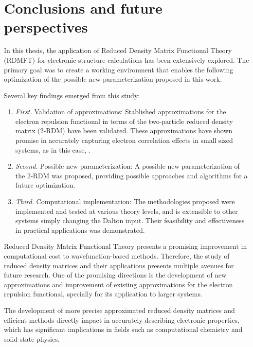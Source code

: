\section{Conclusions and future perspectives} %
\label{sec:conclusions}
In this thesis, the application of Reduced Density Matrix Functional Theory 
(RDMFT) for electronic structure calculations has been extensively explored.
The primary goal was to create a working environment that enables the 
following optimization of the possible new parameterization proposed in this
work.

Several key findings emerged from this study:
\begin{enumerate}[label={}]
    \item \textit{First.} Validation of approximations:
        Stablished approximations for the electron repulsion functional in terms of 
        the two-particle reduced density matrix (2-RDM) have been validated.
        These approximations have shown promise in accurately capturing 
        electron correlation effects in small sized systems, as in this case,
        .
    \item \textit{Second.} Possible new parameterization:
        A possible new parameterization of the 2-RDM was proposed, providing 
        possible approaches and algorithms for a future optimization.
    \item \textit{Third.} Computational implementation:
        The methodologies proposed were implemented and tested at
        various theory levels, and is extensible to other systems
        simply changing the Dalton input.
        Their feasibility and effectiveness in practical applications was
        demonstrated.
\end{enumerate}

Reduced Density Matrix Functional Theory presents a promising improvement
in computational cost to wavefunction-based methods.
Therefore, the study of reduced density matrices and their applications
presents multiple avenues for future research.
One of the promising directions is the development of new approximations
and improvement of existing approximations for the electron repulsion functional,
specially for its application to larger systems.

The development of more precise approximated reduced 
density matrices and efficient methods directly impact in accurately describing
electronic properties, which has significant implications in fields such as
computational chemistry and solid-state physics. 

